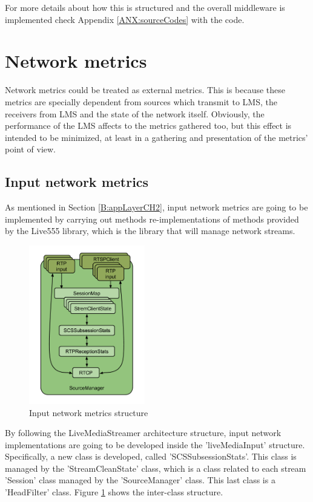 For more details about how this is structured and the overall middleware is implemented check Appendix \ref{ANX:sourceCodes} with the code. 

\section{Network metrics}

Network metrics could be treated as external metrics. This is because these metrics are specially dependent from sources which transmit to LMS, the receivers from LMS and the state of the network itself. Obviously, the performance of the LMS affects to the metrics gathered too, but this effect is intended to be minimized, at least in a gathering and presentation of the metrics' point of view.

\subsection{Input network metrics}

As mentioned in Section \ref{B:appLayerCH2}, input network metrics are going to be implemented by carrying out methods re-implementations of methods provided by the Live555 library, which is the library that will manage network streams.  

\begin{figure}[!htb]
\begin{center}
\includegraphics[width=0.45\textwidth]{./images/SourceManager.png}
\caption{Input network metrics structure}
\label{F:inms}
\end{center}
\end{figure}

By following the LiveMediaStreamer architecture structure, input network implementations are going to be developed inside the 'liveMediaInput' structure. Specifically, a new class is developed, called 'SCSSubsessionStats'. This class is managed by the 'StreamCleanState' class, which is a class related to each stream 'Session' class managed by the 'SourceManager' class. This last class is a 'HeadFilter' class. Figure \ref{F:inms} shows the inter-class structure.

